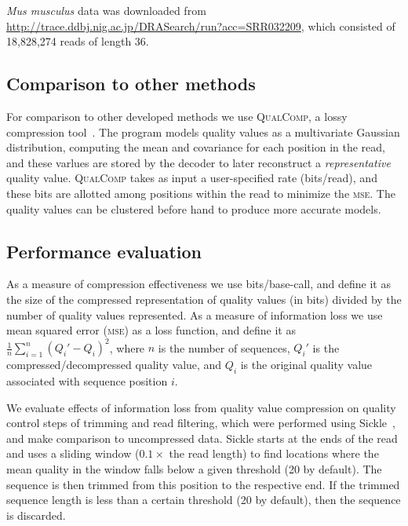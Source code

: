 \documentclass{bioinfo}
\begin{document}
\begin{methods}
\textit{Mus musculus} data was downloaded from
\url{http://trace.ddbj.nig.ac.jp/DRASearch/run?acc=SRR032209}, which
consisted of 18,828,274 reads of length 36.

\subsection{Comparison to other methods}

For comparison to other developed methods we use \textsc{QualComp}, a
lossy compression tool~\citep{Ochoa:2013rt}. The program models
quality values as a multivariate Gaussian distribution, computing the
mean and covariance for each position in the read, and these varlues
are stored by the decoder to later reconstruct a \emph{representative}
quality value. \textsc{QualComp} takes as input a user-specified rate
(bits/read), and these bits are allotted among positions within the
read to minimize the \textsc{mse}. The quality values can be clustered
before hand to produce more accurate models.

\subsection{Performance evaluation}

As a measure of compression effectiveness we use bits/base-call, and
define it as the size of the compressed representation of quality
values (in bits) divided by the number of quality values represented.
As a measure of information loss we use mean squared error
(\textsc{mse}) as a loss function, and define it as
$\frac{1}{n}\sum_{i=1}^{n}{(Q_i'-Q_i)^2}$, where $n$ is the number of
sequences, $Q_i'$ is the compressed/decompressed quality value, and
$Q_i$ is the original quality value associated with sequence position
$i$.

We evaluate effects of information loss from quality value compression
on quality control steps of trimming and read filtering, which were
performed using Sickle~\citep{sickle}, and make comparison to
uncompressed data. Sickle starts at the ends of the read and uses
a sliding window ($0.1 \times$ the read length) to find locations
where the mean quality in the window falls below a given threshold (20
by default). The sequence is then trimmed from this position to the
respective end. If the trimmed sequence length is less than a certain
threshold (20 by default), then the sequence is discarded.


\end{methods}
\end{document}
